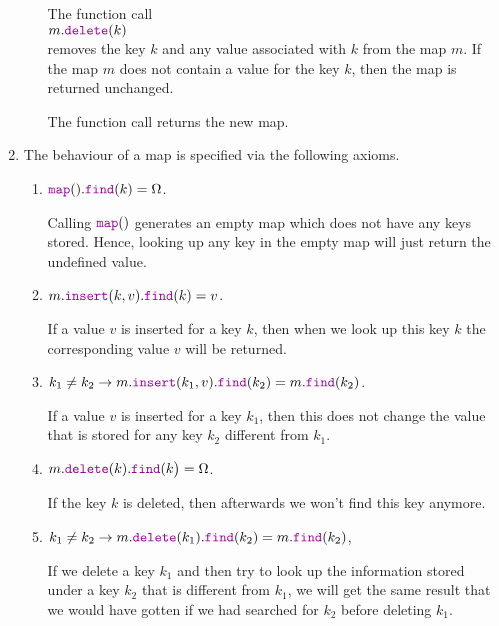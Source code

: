 \begin{Definition}[Map]
\begin{enumerate}
\begin{enumerate}
              The function call
              \\[0.2cm]
              \hspace*{1.3cm}
              $m.\mytt{delete}(k)$ 
              \\[0.2cm]
              removes the key $k$ and any value associated with $k$ from the map $m$.  If the map $m$ does not contain a value for the
              key $k$, then the map is returned unchanged.

              The function call returns the new map. 
        \end{enumerate}
  \item The behaviour of a map is specified via the following axioms.
        \begin{enumerate}
        \item $\mytt{map}().\mytt{find}(k) = \Omega$.

              Calling $\mytt{map}()$ generates an empty map which does not have any keys stored.
              Hence, looking up any key in the empty map will just return the undefined value.
        \item $m.\mytt{insert}(k, v).\mytt{find}(k) = v$.

              If a value $v$ is inserted for a key $k$, then when we look up this key $k$ the corresponding value
              $v$ will be returned.
        \item $k_1 \not= k_2 \rightarrow m.\mytt{insert}(k_1, v).\mytt{find}(k_2) = m.\mytt{find}(k_2)$.

              If a value $v$ is inserted for a key $k_1$, then this does not change the value that is stored
              for any key $k_2$  different from $k_1$.
        \item $m.\mytt{delete}(k).\mytt{find}(k\bigr) = \Omega$.

              If the key $k$ is deleted, then afterwards we won't find this key anymore.
        \item $k_1 \not= k_2 \rightarrow 
               m.\mytt{delete}(k_1).\mytt{find}(k_2) = m.\mytt{find}(k_2)$,

              If  we delete a key $k_1$ and then try to look up the information stored under a key
              $k_2$ that is different from $k_1$, we will get the same result that we would have gotten
              if we had searched for $k_2$ before deleting $k_1$.
              \eox
        \end{enumerate}
  \end{enumerate}
\end{Definition}

